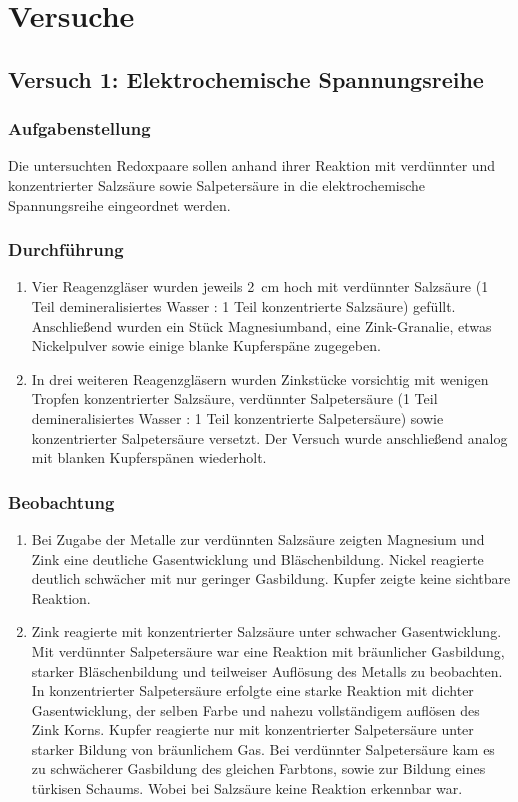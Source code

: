 \section{Versuche}

\subsection{Versuch 1: Elektrochemische Spannungsreihe}
\subsubsection{Aufgabenstellung}
Die untersuchten Redoxpaare sollen anhand ihrer Reaktion mit verdünnter und konzentrierter Salzsäure sowie Salpetersäure in die elektrochemische Spannungsreihe eingeordnet werden.

\subsubsection{Durchführung}
\begin{enumerate}[label=\textbf{\alph*)}]
    \item Vier Reagenzgläser wurden jeweils \SI{2}{cm} hoch mit verdünnter Salzsäure (1 Teil demineralisiertes Wasser : 1 Teil konzentrierte Salzsäure) gefüllt. Anschließend wurden ein Stück Magnesiumband, eine Zink-Granalie, etwas Nickelpulver sowie einige blanke Kupferspäne zugegeben.

    \item In drei weiteren Reagenzgläsern wurden Zinkstücke vorsichtig mit wenigen Tropfen konzentrierter Salzsäure, verdünnter Salpetersäure (1 Teil demineralisiertes Wasser : 1 Teil konzentrierte Salpetersäure) sowie konzentrierter Salpetersäure versetzt. Der Versuch wurde anschließend analog mit blanken Kupferspänen wiederholt.
\end{enumerate}

\subsubsection{Beobachtung}
\begin{enumerate}[label=\textbf{\alph*)}]
    \item Bei Zugabe der Metalle zur verdünnten Salzsäure zeigten Magnesium und Zink eine deutliche Gasentwicklung und Bläschenbildung. Nickel reagierte deutlich schwächer mit nur geringer Gasbildung. Kupfer zeigte keine sichtbare Reaktion.

    \item Zink reagierte mit konzentrierter Salzsäure unter schwacher Gasentwicklung. Mit verdünnter Salpetersäure war eine Reaktion mit bräunlicher Gasbildung, starker Bläschenbildung und teilweiser Auflösung des Metalls zu beobachten. In konzentrierter Salpetersäure erfolgte eine starke Reaktion mit dichter Gasentwicklung, der selben Farbe und nahezu vollständigem auflösen des Zink Korns.
          Kupfer reagierte nur mit konzentrierter Salpetersäure unter starker Bildung von bräunlichem Gas. Bei verdünnter Salpetersäure kam es zu schwächerer Gasbildung des gleichen Farbtons, sowie zur Bildung eines türkisen Schaums.   Wobei bei Salzsäure keine Reaktion erkennbar war.
\end{enumerate}

